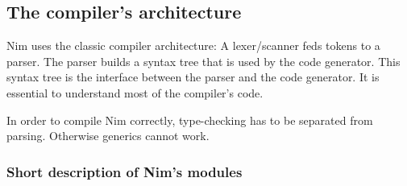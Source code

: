 \hypertarget{the-compilers-architecture}{%
\subsection{The compiler's
architecture}\label{the-compilers-architecture}}

Nim uses the classic compiler architecture: A lexer/scanner feds tokens
to a parser. The parser builds a syntax tree that is used by the code
generator. This syntax tree is the interface between the parser and the
code generator. It is essential to understand most of the compiler's
code.

In order to compile Nim correctly, type-checking has to be separated
from parsing. Otherwise generics cannot work.

\hypertarget{short-description-of-nims-modules}{%
\subsubsection{Short description of Nim's
modules}\label{short-description-of-nims-modules}}

